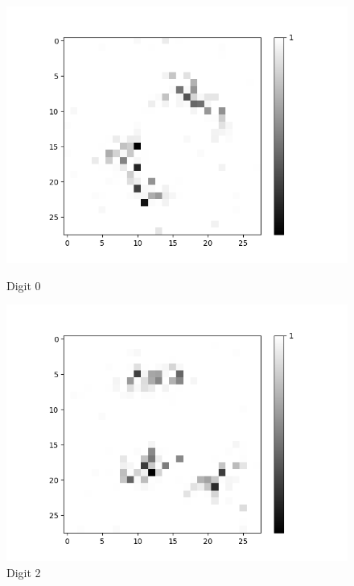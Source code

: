 \begin{figure}[H]
	\captionsetup{labelformat=empty}
	\centering
	\begin{minipage}[b]{0.19\textwidth}
		\includegraphics[width=\textwidth]{AND(LSM)/Positive/Layer0-Neuron-0.png}
		\caption{Digit 0}
	\end{minipage}
	\begin{minipage}[b]{0.19\textwidth}
		\includegraphics[width=\textwidth]{AND(LSM)/Positive/Layer0-Neuron-2.png}
		\caption{Digit 2}
	\end{minipage}
	\begin{minipage}[b]{0.19\textwidth}

\end{minipage}
\end{figure}
